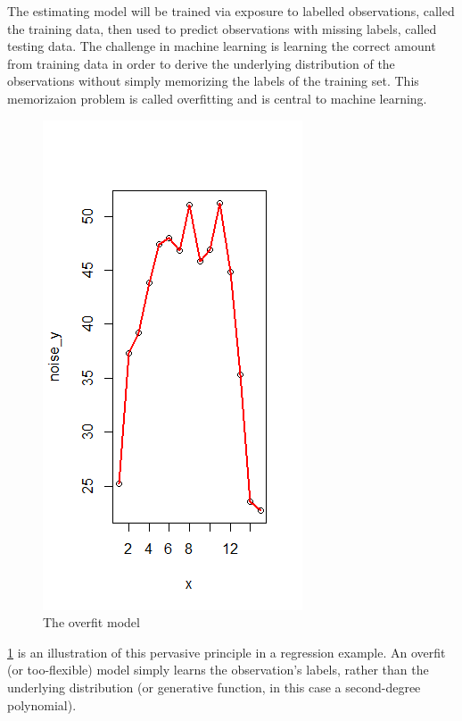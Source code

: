 \documentclass[12pt,twoside]{reedthesis}
\begin{document}
The estimating model will be trained via exposure to labelled
observations, called the training data, then used to predict
observations with missing labels, called testing data. The challenge in
machine learning is learning the correct amount from training data in
order to derive the underlying distribution of the observations without
simply memorizing the labels of the training set. This memorizaion
problem is called overfitting and is central to machine learning.
\begin{figure}
\centering
\includegraphics{figure/overfit.png}
\caption{\label{fig:overfit}The overfit model}
\end{figure}
\ref{fig:overfit} is an illustration of this pervasive principle in a
regression example. An overfit (or too-flexible) model simply learns the
observation's labels, rather than the underlying distribution (or
generative function, in this case a second-degree polynomial).
\end{document}
